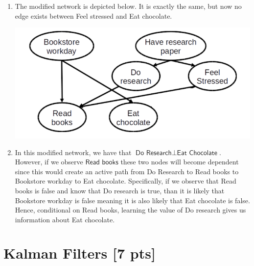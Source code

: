 \documentclass[submit]{harvardml}
\newcommand{\attr}[1]{\textsf{#1}}
\begin{document}
\begin{enumerate}
\item The modified network is depicted below. It is exactly the same, but now no edge exists between   \attr{Feel stressed} and \attr{Eat chocolate}.

\begin{center}
\includegraphics[scale=0.8]{1_5.png}
\end{center}

\item  In this modified network, we have that $\boxed{\attr{Do Research} \perp
  \attr{Eat Chocolate}}$. However, if we observe $\boxed{\attr{Read books} }$ these two nodes will become dependent since this would create an active path from \attr{Do Research} to \attr{Read books} to  \attr{Bookstore workday} to \attr{Eat chocolate}. Specifically, if we observe that \attr{Read books} is false and know that \attr{Do research} is true, than it is likely that \attr{Bookstore workday} is false meaning it is also likely that \attr{Eat chocolate} is false. Hence, conditional on \attr{Read books}, learning the value of \attr{Do research} gives us information about \attr{Eat chocolate}.
  
\end{enumerate}

\newpage

\section*{Kalman Filters [7 pts]}

\end{document}
